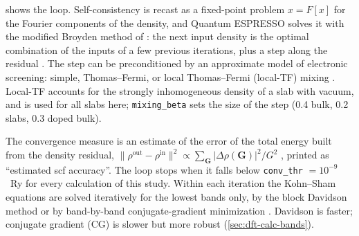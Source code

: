  shows the loop. Self-consistency is recast as a fixed-point problem $x = F[x]$ for the Fourier
components of the density, and Quantum ESPRESSO solves it with the modified Broyden method of \citet{Johnson1988}: the
next input density is the optimal combination of the inputs of a few previous iterations, plus a step along the
residual \citep[pp.~7, 13--14]{Giannozzi2009}. The step can be preconditioned by an approximate model of electronic
screening: simple, Thomas--Fermi, or local Thomas--Fermi (local-TF) mixing \citep[p.~14]{Giannozzi2009}
\citep{Raczkowski2001}. Local-TF accounts for the strongly inhomogeneous density of a slab with vacuum, and is used for
all slabs here; \texttt{mixing\_beta} sets the size of the step (0.4 bulk, 0.2 slabs, 0.3 doped bulk).

The convergence measure is an estimate of the error of the total energy built from the density residual,
$\|\rho^{\mathrm{out}}-\rho^{\mathrm{in}}\|^2 \propto \sum_{\mathbf{G}} |\Delta\rho(\mathbf{G})|^2/G^2$
\citep[p.~14]{Giannozzi2009}, printed as ``estimated scf accuracy''. The loop stops when it falls below
\texttt{conv\_thr} $= 10^{-9}$~Ry for every calculation of this study. Within each iteration the Kohn--Sham equations
are solved iteratively for the lowest bands only, by the block Davidson method or by band-by-band conjugate-gradient
minimization \citep[pp.~14--15]{Giannozzi2009} \citep{Davidson1975,Payne1992}. Davidson is faster; conjugate gradient
(CG) is slower but more robust (\cref{sec:dft-calc-bands}).

